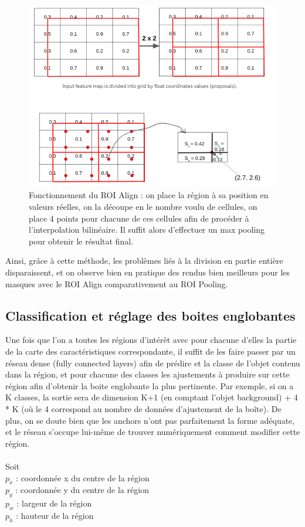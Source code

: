 \begin{figure}[!h]
\centering
\includegraphics[width=200pts]{images/Mask_R_CNN/ROI_Align.png} 
\caption{Fonctionnement du ROI Align : on place la région à sa position en valeurs réelles, on la découpe en le nombre voulu de cellules, on place 4 points pour chacune de ces cellules afin de procéder à l'interpolation bilinéaire. Il suffit alors d'effectuer un max pooling pour obtenir le résultat final.}
\label{ROI_Align}
\end{figure}

Ainsi, grâce à cette méthode, les problèmes liés à la division en partie entière disparaissent, et on observe bien en pratique des rendus bien meilleurs pour les masques avec le ROI Align comparativement au ROI Pooling.

\subsection{Classification et réglage des boites englobantes}

Une fois que l'on a toutes les régions d'intérêt avec pour chacune d'elles la partie de la carte des caractéristiques correspondante, il suffit de les faire passer par un réseau dense (fully connected layers) afin de prédire et la classe de l'objet contenu dans la région, et pour chacune des classes les ajustements à produire sur cette région afin d'obtenir la boite englobante la plus pertinente. Par exemple, si on a K classes, la sortie sera de dimension K+1 (en comptant l'objet background) + 4 * K (où le 4 correspond au nombre de données d'ajustement de la boîte). De plus, on se doute bien que les anchors n'ont pas parfaitement la forme adéquate, et le réseau s'occupe lui-même de trouver numériquement comment modifier cette région. \\
\\
Soit \\
$p_x$ : coordonnée x du centre de la région \\
$p_y$ : coordonnée y du centre de la région \\
$p_w$ : largeur de la région \\
$p_h$ : hauteur de la région \\

